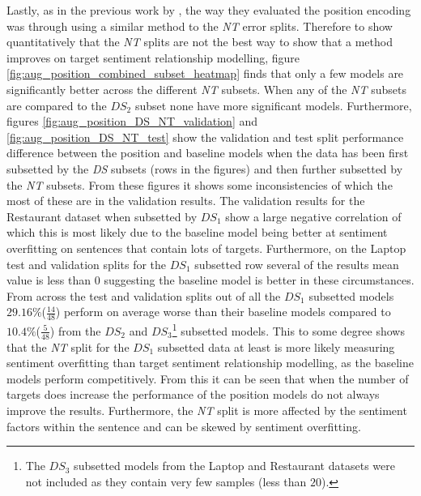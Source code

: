 Lastly, as in the previous work by \citet{he-etal-2018-effective}, the way they evaluated the position encoding was through using a similar method to the \textit{NT} error splits. Therefore to show quantitatively that the \textit{NT} splits are not the best way to show that a method improves on target sentiment relationship modelling, figure \ref{fig:aug_position_combined_subset_heatmap} finds that only a few models are significantly better across the different \textit{NT} subsets. When any of the \textit{NT} subsets are compared to the $DS_2$ subset none have more significant models. Furthermore, figures \ref{fig:aug_position_DS_NT_validation} and \ref{fig:aug_position_DS_NT_test} show the validation and test split performance difference between the position and baseline models when the data has been first subsetted by the \textit{DS} subsets (rows in the figures) and then further subsetted by the \textit{NT} subsets. From these figures it shows some inconsistencies of which the most of these are in the validation results. The validation results for the Restaurant dataset when subsetted by $DS_1$ show a large negative correlation of which this is most likely due to the baseline model being better at sentiment overfitting on sentences that contain lots of targets. Furthermore, on the Laptop test and validation splits for the $DS_1$ subsetted row several of the results mean value is less than $0$ suggesting the baseline model is better in these circumstances. From across the test and validation splits out of all the $DS_1$ subsetted models $29.16\%$($\frac{14}{48}$) perform on average worse than their baseline models compared to $10.4\%$($\frac{5}{48}$) from the $DS_2$ and $DS_3$\footnote{The $DS_3$ subsetted models from the Laptop and Restaurant datasets were not included as they contain very few samples (less than $20$).} subsetted models. This to some degree shows that the \textit{NT} split for the $DS_1$ subsetted data at least is more likely measuring sentiment overfitting than target sentiment relationship modelling, as the baseline models perform competitively. From this it can be seen that when the number of targets does increase the performance of the position models do not always improve the results. Furthermore, the \textit{NT} split is more affected by the sentiment factors within the sentence and can be skewed by sentiment overfitting.

\FloatBarrier
